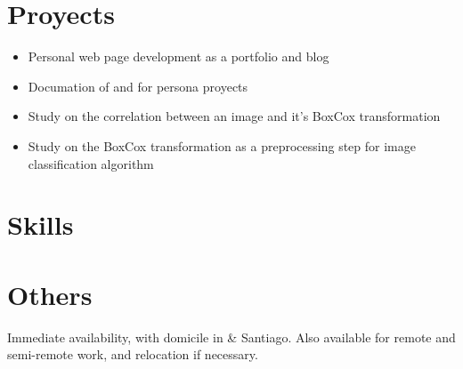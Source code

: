 \documentclass{my_cv}
\begin{document}



\section{Proyects \faCogs}
\begin{itemize}
\item Personal web page development as a portfolio and blog
\item Documation of and for persona proyects
\end{itemize}

\begin{itemize}
\item Study on the correlation between an image and it's BoxCox transformation
\item Study on the BoxCox transformation as a preprocessing step for image classification algorithm
\end{itemize}

\section{Skills \faBullseye}



\section{Others \faPaperPlane}
Immediate availability, with domicile in {\valpo} \& Santiago. Also available for remote and semi-remote work, and relocation if necessary.

\end{document}
